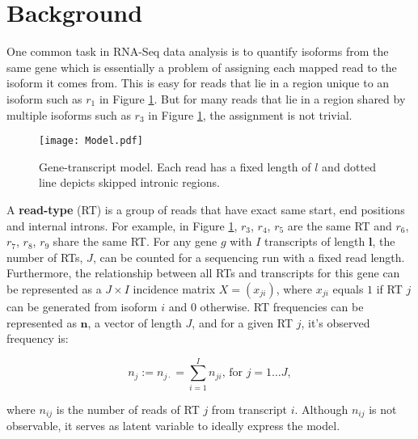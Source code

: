 \documentclass[11pt]{article}
\begin{document}
\section{Background}
\label{background}

\indent One common task in RNA-Seq data analysis is to quantify isoforms from the same gene which is essentially a problem of assigning each mapped read to the isoform it comes from.  This is easy for reads that lie in a region unique to an isoform such as $r_1$ in Figure \ref{model}.  But for many reads that lie in a region shared by multiple isoforms such as $r_3$ in Figure \ref{model}, the assignment is not trivial. 

\begin{figure}[H]
\centering
\texttt{[image: Model.pdf]}
\caption{Gene-transcript model. Each read has a fixed length of $l$ and dotted line depicts skipped intronic regions.}
\label{model}
\end{figure}

\noindent A \textbf{read-type} (RT) is a group of reads that have exact same start, end positions and internal introns.  For example, in Figure \ref{model}, $r_3$, $r_4$, $r_5$ are the same RT and $r_6$, $r_7$, $r_8$, $r_9$ share the same RT.  For any gene $g$ with $I$ transcripts of length $\mathbf{l}$, the number of RTs, $J$, can be counted for a sequencing run with a fixed read length.  Furthermore, the relationship between all RTs and transcripts for this gene can be represented as a $J \times I$ incidence matrix $X=(x_{ji})$, where $x_{ji}$ equals $1$ if RT $j$ can be generated from isoform $i$ and $0$ otherwise.  RT frequencies can be represented as $\mathbf{n}$, a vector of length $J$, and for a given RT $j$, it’s observed frequency is:

\[n_j:=n_{j\cdot}=\sum_{i=1}^{I}n_{ji}\text{, for }j=1\ldots J,\]
  
\noindent where $n_{ij}$ is the number of reads of RT $j$ from transcript $i$. Although $n_{ij}$ is not observable, it serves as latent variable to ideally express the model.\\ 
\end{document}
